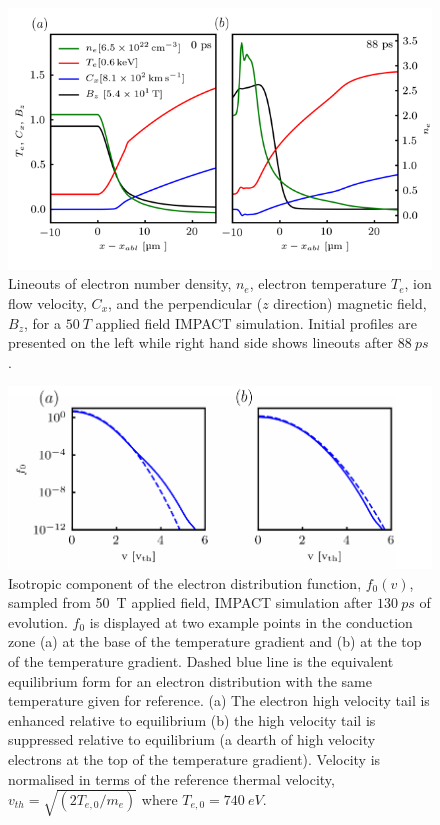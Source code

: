 \documentclass[aip,reprint]{revtex4-1}
\begin{document}
\begin{figure}
\includegraphics[width=1.0\columnwidth]{pics/one_dim_2col15.png}%
\caption{\label{fig:1Dprof} Lineouts of electron number density, $n_e$, electron temperature $T_e$, ion flow velocity, $C_x$, and the perpendicular ($z$ direction) magnetic field, $B_z$, for a $\SI{50}{T}$ applied field IMPACT simulation. Initial profiles are presented on the left while right hand side shows lineouts after $\SI{88}{ps}$. }%
\end{figure}

\begin{figure}
	\includegraphics[width=1.0\columnwidth]{pics/f0_50T_LT1_noTe.pdf}%
	\caption{\label{fig:f0prof} Isotropic component of the electron distribution function, $f_0(v)$, sampled from \SI{50}{T} applied field, IMPACT simulation after $\SI{130}{ps}$ of evolution. $f_0$ is displayed at two example points in the conduction zone  (a) at the base of the temperature gradient and (b) at the top of the temperature gradient. Dashed blue line is the equivalent equilibrium form for an electron distribution with the same temperature given for reference. (a) The electron high velocity tail is enhanced relative to equilibrium (b) the high velocity tail is suppressed relative to equilibrium (a dearth of high velocity electrons at the top of the temperature gradient).   Velocity is normalised in terms of the reference thermal velocity, $v_{th}= \sqrt{(2 T_{e,0}/m_e)}$ where $T_{e,0}= \SI{740}{eV}$.} %
\end{figure}
\end{document}
